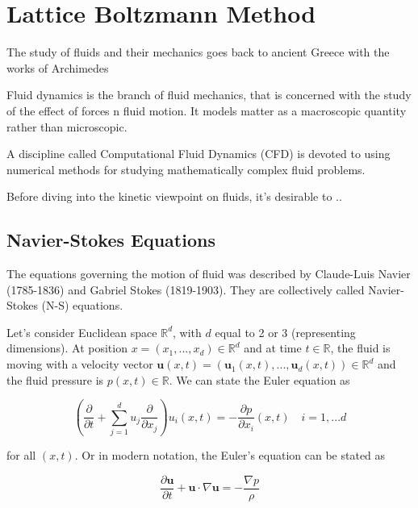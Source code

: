 \section{Lattice Boltzmann Method}

The study of fluids and their mechanics goes back to ancient Greece with the works of Archimedes

Fluid dynamics is the branch of fluid mechanics, that is concerned with the study of the effect of forces n fluid motion. It models matter as a macroscopic quantity rather than microscopic. 

A discipline called Computational Fluid Dynamics (CFD) is devoted to using numerical methods for studying mathematically complex fluid problems.

Before diving into the kinetic viewpoint on fluids, it's desirable to ..

\subsection{Navier-Stokes Equations}

The equations governing the motion of fluid was described by Claude-Luis Navier (1785-1836) and Gabriel Stokes (1819-1903). They are collectively called Navier-Stokes (N-S) equations. 

Let's consider Euclidean space $\mathbb{R}^d$, with $d$ equal to 2 or 3 (representing dimensions). At position $x = (x_1,...,x_d) \in \mathbb{R}^d$ and at time $t \in \mathbb{R}$, the fluid is moving with a velocity vector $\bm{u}(x,t) = (\bm{u}_1(x,t),...,\bm{u}_d(x,t)) \in \mathbb{R}^d$ and the fluid pressure is $p(x,t) \in \mathbb{R}$. We can state the Euler equation as


\begin{equation} 
	\label{eqn:ee}
	\left(\frac{\partial}{\partial t} + \sum_{j=1}^{d} u_j \frac{\partial}{\partial x_j}\right) u_i(x,t) = - \frac{\partial p}{\partial x_i} (x,t) \quad  i = 1,...d
\end{equation}

for all $(x, t)$. Or in modern notation, the Euler's equation can be stated as

\begin{equation} 
	\label{eqn:ee-modern}
	\frac{\partial \bm{u}}{\partial t} + \bm{u} \cdot \nabla \bm{u} = - \frac{\nabla p}{\rho}
\end{equation}

